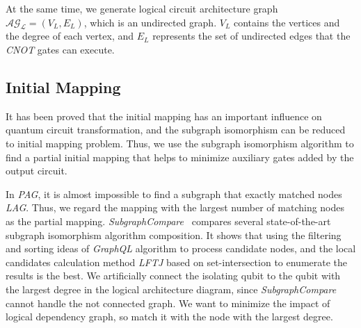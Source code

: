 \documentclass[runningheads]{llncs}
\begin{document}
At the same time, we generate logical circuit architecture graph $\mathcal{AG_{L}}=(V_{L},E_{L})$, which is an undirected graph. $V_{L}$ contains the vertices and the degree of each vertex, and $E_{L}$ represents the set of undirected edges that the \textit{CNOT} gates can execute.

\subsection{Initial Mapping}
It has been proved that the initial mapping has an important influence on quantum circuit transformation,  and the subgraph isomorphism can be reduced to initial mapping problem. Thus, we use the subgraph isomorphism algorithm to find a partial initial mapping that helps to minimize auxiliary gates added by the output circuit.

In \textit{PAG}, it is almost impossible to find a subgraph that exactly matched nodes \textit{LAG}. Thus, we regard the mapping with the largest number of matching nodes as the partial mapping. \textit{SubgraphCompare}~\cite{Sun2020} compares several state-of-the-art subgraph isomorphism algorithm composition. 
It shows that using the filtering and sorting ideas of \emph{GraphQL} algorithm to process candidate nodes, and the local candidates calculation method \emph{LFTJ} based on set-intersection to enumerate the results is the best. We artiﬁcially connect the isolating qubit to the qubit with the largest degree in the logical architecture diagram, since \textit{SubgraphCompare} cannot handle the not connected graph. We want to minimize the impact of logical dependency graph, so match it with the node with the largest degree.
\end{document}
